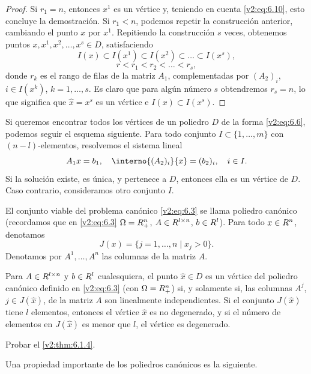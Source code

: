 \begin{proof}
    Si $r_1 = n$, entonces $x^1$ es un vértice y, teniendo en cuenta \eqref{v2:eq:6.10}, esto concluye la demostración. Si $r_1 < n$, podemos repetir la construcción anterior, cambiando el punto $x$ por $x^1$. Repitiendo la construcción $s$ veces, obtenemos puntos $x, x^1, x^2, \dots, x^s \in D$, satisfaciendo
    \[
        I(x) \subset I(x^1) \subset I(x^2) \subset \dots \subset I(x^s),
    \]
    \[
        r < r_1 < r_2 < \dots < r_s,
    \]
    donde $r_k$ es el rango de filas de la matriz $A_1$, complementadas por $(A_2)_i$, $i \in I(x^k)$, $k = 1, \dots, s$. Es claro que para algún número $s$ obtendremos $r_s = n$, lo que significa que $\hat{x} = x^s$ es un vértice e $I(x) \subset I(x^s)$.
\end{proof}

Si queremos encontrar todos los vértices de un poliedro $D$ de la forma \eqref{v2:eq:6.6}, podemos seguir el esquema siguiente. Para todo conjunto $I \subset \{1, \dots, m\}$ con $(n - l)$-elementos, resolvemos el sistema lineal
\[
    A_1 x = b_1, \quad \interno{(A_2)_i}{x} = (b_2)_i, \quad i \in I.
\]
Si la solución existe, es única, y pertenece a $D$, entonces ella es un vértice de $D$. Caso contrario, consideramos otro conjunto $I$.

El conjunto viable del problema canónico \eqref{v2:eq:6.3} se llama poliedro canónico (recordamos que en \eqref{v2:eq:6.3} $\Omega = R^n_+$, $A \in R^{l \times n}$, $b \in R^l$). Para todo $x \in R^n$, denotamos
\[
    J(x) = \{ j = 1, \dots, n \mid x_j > 0 \}.
\]
Denotamos por $A^1, \dots, A^n$ las columnas de la matriz $A$.

\begin{theorem}\label{v2:thm:6.1.4}
    Para $A \in R^{l \times n}$ y $b \in R^l$ cualesquiera, el punto $\hat{x} \in D$ es un vértice del poliedro canónico definido en \eqref{v2:eq:6.3} (con $\Omega = R^n_+$) si, y solamente si, las columnas $A^j$, $j \in J(\hat{x})$, de la matriz $A$ son linealmente independientes. Si el conjunto $J(\hat{x})$ tiene $l$ elementos, entonces el vértice $\hat{x}$ es no degenerado, y si el número de elementos en $J(\hat{x})$ es menor que $l$, el vértice es degenerado.
\end{theorem}

\begin{exercise}\label{v2:ejer:6.1.2}
    Probar el \cref{v2:thm:6.1.4}.
\end{exercise}

Una propiedad importante de los poliedros canónicos es la siguiente.

